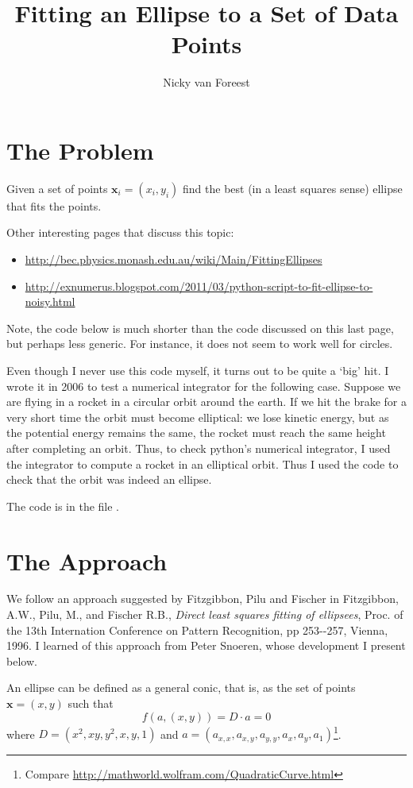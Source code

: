 \documentclass[a4paper,11pt]{article}
\title{Fitting an Ellipse to a Set of Data Points}
\author{Nicky van Foreest}
\date{}
\begin{document}
\maketitle


\section{The Problem}

Given a set of points $\mathbf{x}_i = (x_i,y_i)$ find the best (in a least squares sense) ellipse that fits the points.

Other interesting pages that discuss this topic:
\begin{itemize}
\item \url{http://bec.physics.monash.edu.au/wiki/Main/FittingEllipses}
\item \url{http://exnumerus.blogspot.com/2011/03/python-script-to-fit-ellipse-to-noisy.html}
\end{itemize}
Note, the code below is much shorter than the code discussed on this last page, but perhaps less generic.
For instance, it does not seem to work well for circles.

Even though I never use this code myself, it turns out to be quite a `big' hit.
I wrote it in 2006 to test a numerical integrator for the following case.
Suppose we are flying in a rocket in a circular orbit around the earth.
If we hit the brake for a very short time the orbit must become elliptical: we lose kinetic energy, but as the potential energy remains the same, the rocket must reach the same height after completing an orbit.
Thus, to check python's numerical integrator, I used the integrator to compute a rocket in an elliptical orbit.
Thus I used the code to check that the orbit was indeed an ellipse.

The code is in the file .

\section{The Approach}

We follow an approach suggested by Fitzgibbon, Pilu and Fischer in Fitzgibbon, A.W., Pilu, M., and Fischer R.B., \emph{Direct least squares fitting of ellipsees}, Proc.
of the 13th Internation Conference on Pattern Recognition, pp 253-{}-257, Vienna, 1996.
I learned of this approach from Peter Snoeren, whose development I present below.

An ellipse can be defined as a general conic, that is, as the set of points $\mathbf{x} = (x,y)$ such that
\begin{equation}\label{eq:1}
f(a, (x,y)) = D\cdot a = 0
\end{equation}
where  $D = (x^2, xy, y^2, x, y, 1)$ and $a = (a_{x,x}, a_{x,y}, a_{y,y}, a_x, a_y, a_1)$\footnote{Compare \url{http://mathworld.wolfram.com/QuadraticCurve.html}}.
\end{document}

